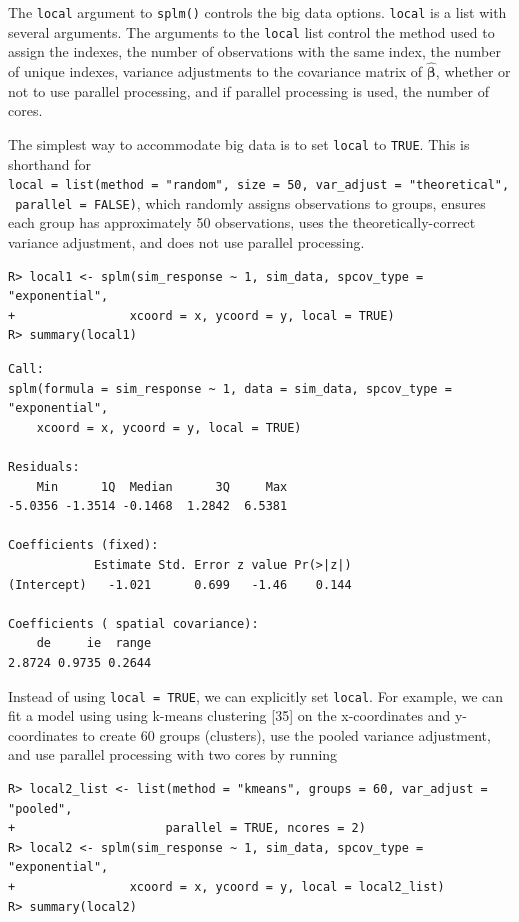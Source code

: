 \documentclass[10pt,letterpaper]{article}
\begin{document}
The \texttt{local} argument to \texttt{splm()} controls the big data
options. \texttt{local} is a list with several arguments. The arguments
to the \texttt{local} list control the method used to assign the
indexes, the number of observations with the same index, the number of
unique indexes, variance adjustments to the covariance matrix of
\(\hat{\boldsymbol{\beta}}\), whether or not to use parallel processing,
and if parallel processing is used, the number of cores.

The simplest way to accommodate big data is to set \texttt{local} to
\texttt{TRUE}. This is shorthand for
\texttt{local\ =\ list(method\ =\ "random",\ size\ =\ 50,\ var\_adjust\ =\ "theoretical",\ parallel\ =\ FALSE)},
which randomly assigns observations to groups, ensures each group has
approximately 50 observations, uses the theoretically-correct variance
adjustment, and does not use parallel processing.

\begin{verbatim}
R> local1 <- splm(sim_response ~ 1, sim_data, spcov_type = "exponential", 
+                xcoord = x, ycoord = y, local = TRUE)
R> summary(local1)
\end{verbatim}

\begin{verbatim}
Call:
splm(formula = sim_response ~ 1, data = sim_data, spcov_type = "exponential", 
    xcoord = x, ycoord = y, local = TRUE)

Residuals:
    Min      1Q  Median      3Q     Max 
-5.0356 -1.3514 -0.1468  1.2842  6.5381 

Coefficients (fixed):
            Estimate Std. Error z value Pr(>|z|)
(Intercept)   -1.021      0.699   -1.46    0.144

Coefficients ( spatial covariance):
    de     ie  range 
2.8724 0.9735 0.2644 
\end{verbatim}

Instead of using \texttt{local\ =\ TRUE}, we can explicitly set
\texttt{local}. For example, we can fit a model using using k-means
clustering {[}35{]} on the x-coordinates and y-coordinates to create 60
groups (clusters), use the pooled variance adjustment, and use parallel
processing with two cores by running

\begin{verbatim}
R> local2_list <- list(method = "kmeans", groups = 60, var_adjust = "pooled",
+                     parallel = TRUE, ncores = 2)
R> local2 <- splm(sim_response ~ 1, sim_data, spcov_type = "exponential", 
+                xcoord = x, ycoord = y, local = local2_list)
R> summary(local2)
\end{verbatim}
\end{document}
